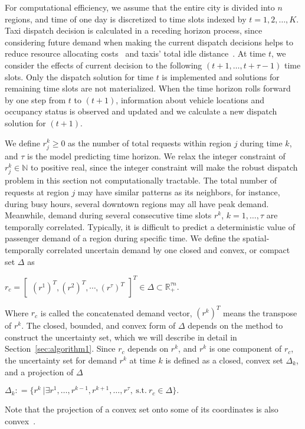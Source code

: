 \documentclass[10pt,twocolumn,twoside,english]{IEEEtran}
\begin{document}
For computational efficiency, we assume that the entire city is divided into $n$ regions, and time of one day is discretized to time slots indexed by $t=1, 2, \dots, K$. Taxi dispatch decision is calculated in a receding horizon process, since considering future demand when making the current dispatch decisions helps to reduce resource allocating costs~\cite{mod} and taxis' total idle distance~\cite{Miao_tase16}. At time $t$, we consider the effects of current decision to the following $(t+1,\dots,t+\tau-1)$ time slots. Only the dispatch solution for time $t$ is implemented and solutions for remaining time slots are not materialized. When the time horizon rolls forward by one step from $t$ to $(t+1)$, information about vehicle locations and occupancy status is observed and updated and we calculate a new dispatch solution for $(t+1)$. 


We define $r^k_j \geqslant 0$ as the number of total requests within region $j$ during time $k$, and $\tau$ is the model predicting time horizon. We relax the integer constraint of $r^k_{j} \in \mathbb{N}$ to positive real, since the integer constraint will make the robust dispatch problem in this section not computationally tractable. The total number of requests at region $j$ may have similar patterns as its neighbors, for instance, during busy hours, several downtown regions may all have peak demand. Meanwhile, demand during several consecutive time slots $r^k$, $k=1,\dots, \tau$ are temporally correlated. Typically, it is difficult to predict a deterministic value of passenger demand of a region during specific time. We define the spatial-temporally correlated uncertain demand by one closed and convex, or compact set $\Delta$ as
\\\centerline{$
r_c=\begin{bmatrix}(r^1)^T, (r^2)^T, \cdots, (r^{\tau})^T \end{bmatrix}^T \in \Delta \subset \mathbb{R}_+^{\tau n}.
 $}               
Where $r_c$ is called the concatenated demand vector, $(r^k)^T$ means the transpose of $r^k$. The closed, bounded, and convex form of $\Delta$ depends on the method to construct the uncertainty set, which we will describe in detail in Section~\ref{sec:algorithm1}. Since $r_c$ depends on $r^k$, and $r^k$ is one component of $r_c$, the uncertainty set for demand $r^k$ at time $k$ is defined as a closed, convex set $\Delta_k$, and a projection of $\Delta$
\\\centerline{$
\Delta_k: = \{r^k\ | \exists r^1,\dots,r^{k-1},r^{k+1},\dots,r^{\tau},\ \text{s.t.}\ r_c \in \Delta\}.
$}
Note that the projection of a convex set onto some of its coordinates is also convex~\cite[Chapter 2.3.2]{book_convex}. 
\end{document}

